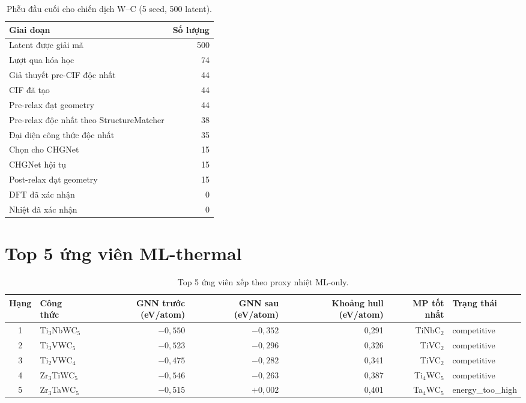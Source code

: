\documentclass[11pt,a4paper]{report}
\newcommand{\eV}{eV/atom}
\begin{document}
\begin{table}[h]
\centering
\caption{Phễu đầu cuối cho chiến dịch W--C (5 seed, 500 latent).}
\label{tab:funnel}
\begin{tabular}{lr}
\toprule
\textbf{Giai đoạn} & \textbf{Số lượng} \\
\midrule
Latent được giải mã & 500 \\
Lượt qua hóa học & 74 \\
Giả thuyết pre-CIF độc nhất & 44 \\
CIF đã tạo & 44 \\
Pre-relax đạt geometry & 44 \\
Pre-relax độc nhất theo StructureMatcher & 38 \\
Đại diện công thức độc nhất & 35 \\
Chọn cho CHGNet & 15 \\
CHGNet hội tụ & 15 \\
Post-relax đạt geometry & 15 \\
\midrule
DFT đã xác nhận & 0 \\
Nhiệt đã xác nhận & 0 \\
\bottomrule
\end{tabular}
\end{table}

\section{Top 5 ứng viên ML-thermal}

\begin{table}[h]
\centering
\caption{Top 5 ứng viên xếp theo proxy nhiệt ML-only.}
\label{tab:top5}
\begin{tabular}{clrrrrl}
\toprule
\textbf{Hạng} & \textbf{Công thức} & \textbf{GNN trước (\eV)} & \textbf{GNN sau (\eV)} & \textbf{Khoảng hull (\eV)} & \textbf{MP tốt nhất} & \textbf{Trạng thái} \\
\midrule
1 & Ti$_3$NbWC$_5$  & $-0{,}550$ & $-0{,}352$ & 0{,}291 & TiNbC$_2$  & competitive \\
2 & Ti$_3$VWC$_5$   & $-0{,}523$ & $-0{,}296$ & 0{,}326 & TiVC$_2$   & competitive \\
3 & Ti$_2$VWC$_4$   & $-0{,}475$ & $-0{,}282$ & 0{,}341 & TiVC$_2$   & competitive \\
4 & Zr$_3$TiWC$_5$  & $-0{,}546$ & $-0{,}263$ & 0{,}387 & Ti$_4$WC$_5$ & competitive \\
5 & Zr$_3$TaWC$_5$  & $-0{,}515$ & $+0{,}002$ & 0{,}401 & Ta$_4$WC$_5$ & energy\_too\_high \\
\bottomrule
\end{tabular}
\end{table}
\end{document}
